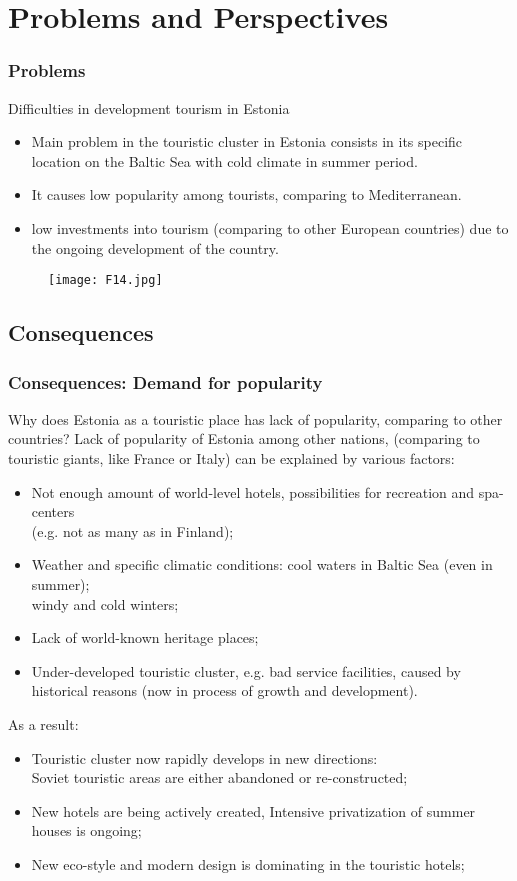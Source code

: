 \documentclass[pdflatex,compress,8pt,
	xcolor={dvipsnames,dvipsnames,svgnames,x11names,table},
]{beamer}
\begin{document}
\section{Problems and Perspectives}
\begin{frame}\frametitle{Problems}
Difficulties in development tourism in Estonia
\begin{itemize}
	\item Main problem in the touristic cluster in Estonia consists in its specific location on the Baltic Sea with cold climate in summer period. 
	\item It causes low popularity among tourists, comparing to Mediterranean.
	\item low investments into tourism (comparing to other European countries) due to the ongoing development of the country.
\end{itemize}
\begin{figure}[H]
	\centering
		\texttt{[image: F14.jpg]}
\end{figure}
\end{frame}

\subsection{Consequences}
\begin{frame}\frametitle{Consequences: Demand for popularity}
Why does Estonia as a touristic place has lack of popularity, comparing to other countries? Lack of popularity of Estonia among other nations, (comparing to touristic giants, like France or Italy) can be explained by various factors:
\begin{itemize}
	\item Not enough amount of world-level hotels, possibilities for recreation and spa-centers\\ (e.g. not as many as in Finland);
	\item Weather and specific climatic conditions: cool waters in Baltic Sea (even in summer); \\windy and cold winters;
	\item Lack of world-known heritage places;
	\item Under-developed touristic cluster, e.g. bad service facilities, caused by historical reasons (now in process of growth and development).
\end{itemize}
As a result:
\begin{itemize}
	\item Touristic cluster now rapidly develops in new directions: \\Soviet touristic areas are either abandoned or re-constructed;
	\item New hotels are being actively created, Intensive privatization of summer houses is ongoing;
	\item New eco-style and modern design is dominating in the touristic hotels;
\end{itemize}
\end{frame}
\end{document}
